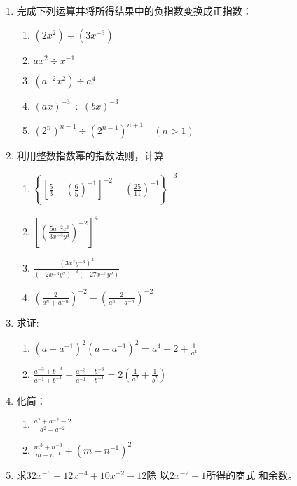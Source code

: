 \begin{enumerate}
\item 完成下列运算并将所得结果中的负指数变换成正指数：
\begin{multicols}{2}
 \begin{enumerate}
    \item $(2x^2)\div (3x^{-3})$
    \item $ax^2\div x^{-1}$
    \item $(a^{-2}x^2)\div a^4$
    \item $(ax)^{-3}\div (bx)^{-3}$
    \item $(2^n)^{n-1} \div (2^{n-1})^{n+1}\quad (n>1)$
\end{enumerate}   
\end{multicols}

\item 利用整数指数幂的指数法则，计算
\begin{multicols}{2}\begin{enumerate}  
\item $\left\{\left[\frac{5}{3}-\left(\frac{6}{5}\right)^{-1}\right]^{-2}-\left(\frac{25}{11}\right)^{-1}\right\}^{-3}$\item $\left[\left(\frac{5 a^{-2} c^{3}}{3 x^{-3} y^{4}}\right)^{-2}\right]^{4}$
\item $\frac{\left(3 x^{2} y^{-3}\right)^4}{\left(-2 x^{-3} y^{2}\right)^{-3}\left(-27 x^{-5} y^{2}\right)}$
\item $\left(\frac{2}{a^{n}+a^{-n}}\right)^{-2}-\left(\frac{2}{a^{n}-a^{-n}}\right)^{-2}$
\end{enumerate}\end{multicols}

\item 求证:
\begin{enumerate}
    \item $\left(a+a^{-1}\right)^{2}\left(a-a^{-1}\right)^{2}=a^{4}-2+\frac{1}{a^{4}}$
    \item $\frac{a^{-3}+b^{-3}}{a^{-1}+b^{-1}}+\frac{a^{-3}-b^{-3}}{a^{-1}-b^{-1}}=2\left(\frac{1}{a^{2}}+\frac{1}{b^{2}}\right)$
\end{enumerate}

\item 化简：
 \begin{multicols}{2}
\begin{enumerate}
    \item  $\frac{a^{2}+a^{-2}-2}{a^{2}-a^{-2}}$
    \item  $\frac{m^{3}+n^{-3}}{m+n^{-1}}+\left(m-n^{-1}\right)^{2}$
\end{enumerate}
\end{multicols}
\item 求$32x^{-6}+12x^{-4}+10x^{-2}-12$除
以$2x^{-2}-1$所得的商式
和余数。
\end{enumerate}

